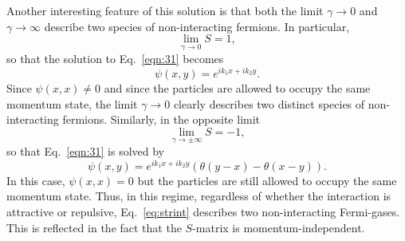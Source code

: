 \documentclass[aps,pra,
superscriptaddress,
reprint,twocolumn,preprintnumbers,
amsmath,amssymb,
nofootinbib]{revtex4-1}
\begin{document}
Another interesting feature of this solution is that 
both the limit $\gamma \rightarrow 0$ and $\gamma\rightarrow \infty$ describe two species of non-interacting fermions. In particular,
		\begin{equation}
		\lim_{\gamma\to0} S = 1,
		\end{equation}
so that the solution to Eq.~\eqref{eqn:31} becomes
		\begin{equation}
		\psi(x,y) = e^{i k_1 x + i k_2 y}.
		\end{equation}
Since $\psi(x,x)\neq 0$ and since the particles are allowed to occupy the same momentum state, the limit $\gamma \to 0$ clearly describes two distinct species of non-interacting fermions. Similarly, in the opposite limit
		\begin{equation}
		\lim_{\gamma \to \pm \infty} S = -1,
		\end{equation}
so that Eq.~\eqref{eqn:31} is solved by 
		\begin{equation}
		\psi(x,y) = e^{i k_1 x + i k_2 y}(\theta(y-x) - \theta(x-y)).
		\end{equation}
In this case, $\psi(x,x) = 0$ but the particles are still allowed to occupy the same momentum state. Thus, in this regime, regardless of whether the interaction is attractive or repulsive, Eq.~\eqref{eq:strint} describes two non-interacting Fermi-gases. This is reflected in the fact that the $S$-matrix is momentum-independent. 
\end{document}
